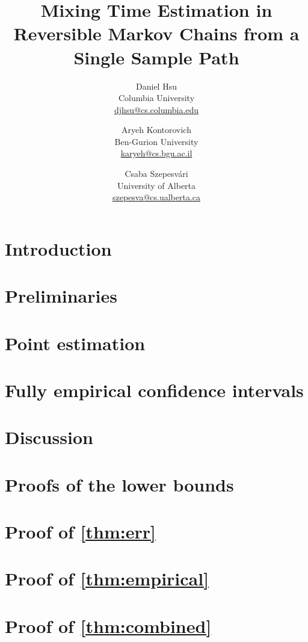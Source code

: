\documentclass{article}
\title{%
  Mixing Time Estimation in Reversible Markov Chains from a Single
  Sample Path%
}
\author{%
  Daniel Hsu \\
  Columbia University \\
  \url{djhsu@cs.columbia.edu}
  \and
  Aryeh Kontorovich \\
  Ben-Gurion University \\
  \url{karyeh@cs.bgu.ac.il}
  \and
  Csaba Szepesv\'ari \\
  University of Alberta \\
  \url{szepesva@cs.ualberta.ca}
}
\begin{document}
\maketitle

\begin{abstract} 

\end{abstract} 

\section{Introduction}\label{sec:intro}


\section{Preliminaries}\label{sec:prelim}


\section{Point estimation}\label{sec:rates}


\section{Fully empirical confidence intervals}\label{sec:empirical}


\section{Discussion}\label{sec:discussion}





\appendix

\section{Proofs of the lower bounds}\label{app:lower}


\section{Proof of \cref{thm:err}}\label{app:upper}


\section{Proof of \cref{thm:empirical}}\label{app:empirical}


\section{Proof of \cref{thm:combined}}\label{app:combined}

\end{document}
